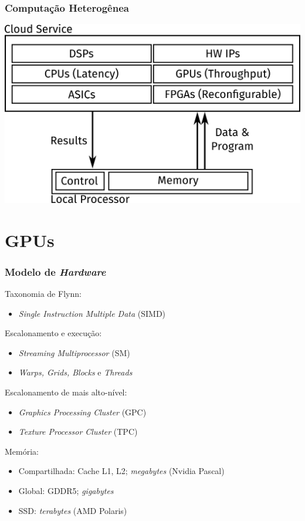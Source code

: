 \documentclass[10pt, compress]{beamer}
\begin{document}
\begin{frame}
    \frametitle{Computação Heterogênea}
    \centering
    \includegraphics[width=.85\textwidth]{heterogeneous}
\end{frame}

\section*{GPUs}

\begin{frame}
    \frametitle{Modelo de \textit{Hardware}}
    Taxonomia de Flynn:
    \begin{itemize}
        \item \textit{Single Instruction Multiple Data} (SIMD)
    \end{itemize}
    \pause
    Escalonamento e execução:
    \begin{itemize}
        \item \textit{Streaming Multiprocessor} (SM)
        \item \textit{Warps, Grids, Blocks} e \textit{Threads}
    \end{itemize}
    \pause
    Escalonamento de mais alto-nível:
    \begin{itemize}
        \item \textit{Graphics Processing Cluster} (GPC)
        \item \textit{Texture Processor Cluster} (TPC)
    \end{itemize}
    \pause
    Memória:
    \begin{itemize}
        \item Compartilhada: Cache L1, L2; \textit{megabytes} (Nvidia Pascal)
        \item Global: GDDR5; \textit{gigabytes}
            \pause
        \item SSD: \alert{\textit{terabytes}} (AMD Polaris)
    \end{itemize}
\end{frame}
\end{document}
